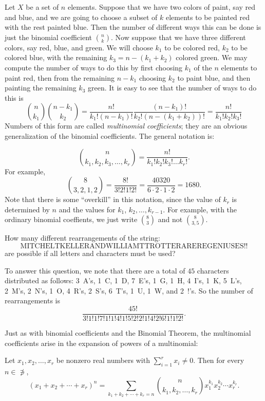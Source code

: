 Let $X$ be a set of $n$ elements.  Suppose that we have
two colors of paint, say red and blue, and we are going to
choose a subset of $k$ elements to be painted red with the
rest painted blue.  Then the number of different ways this
can be done is just the binomial coefficient $\binom{n}{k}$.
Now suppose that we have three different colors, say red,
blue, and green.  We will choose $k_1$ to be
colored red, $k_2$ to be colored blue, with the remaining
$k_3 = n - (k_1+k_2)$ colored green.  We may compute the number of
ways to do this by first choosing $k_1$ of the $n$ elements to paint
red, then from the remaining $n-k_1$ choosing $k_2$ to paint blue, and
then painting the remaining $k_3$ green. It is easy to see that 
the number of ways to do this is 
\[
\binom{n}{k_1}\binom{n-k_1}{k_2} = \frac{n!}{k_1!(n-k_1)!}
\frac{(n-k_1)!}{k_2!(n-(k_1+k_2))!} = \frac{n!}{k_1!k_2!k_3!}
\]
Numbers of this form are called \textit{multinomial coefficients};
they are an obvious generalization of the binomial coefficients.
The general notation is:

\[
\binom{n}{k_1,k_2,k_3,\dots,k_r}=\frac{n!}{k_1!k_2!k_3!\dots k_r!}.
\]
For example, 
\[
\binom{8}{3,2,1,2}=\frac{8!}{3!2!1!2!}= 
  \frac{40320}{6\cdot2\cdot1\cdot2}=1680.
\]
Note that there is some ``overkill'' in this notation, since
the value of $k_r$ is determined by $n$ and the values for
$k_1$, $k_2,\dots,k_{r-1}$.  For example, with the ordinary
binomial coeffients, we just write $\binom{8}{3}$ and not
$\binom{8}{3,5}$.

\begin{example} 
How many different rearrangements of the string:
\[
\text{MITCHELTKELLERANDWILLIAMTTROTTERAREREGENIUSES!!}
\]
are possible if all letters and characters must be used?

To answer this question, we note that there are a total of $45$
characters distributed as follows: 3~A's, 1~C, 1~D, 7~E's, 1~G, 1~H,
4~I's, 1~K, 5~L's, 2~M's, 2~N's, 1~O, 4~R's, 2~S's, 6~T's, 1~U, 1~W,
and 2~!'s.  So the number of rearrangements is
\[
\frac{45!}{3!1!1!7!1!1!4!1!5!2!2!1!4!2!6!1!1!2!}.
\]
\end{example}

Just as with binomial coefficients and the Binomial Theorem, the
multinomial coefficients arise in the expansion of powers of a
multinomial:

\begin{theorem}
  Let $x_1, x_2, \dots, x_r$ be nonzero real numbers with
  $\sum_{i=1}^r x_i\neq 0$. Then for every $n\in \nni$,
  \[(x_1+x_2+\cdots + x_r)^n =
  \sum_{k_1+k_2+\cdots+k_r=n}\binom{n}{k_1,k_2,\dots,k_r}
  x_1^{k_1}x_2^{k_2}\cdots x_r^{k_r}.\]
\end{theorem}

